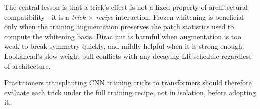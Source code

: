 \documentclass[10pt,twocolumn]{article}
\begin{document}
The central lesson is that a trick's effect is not a fixed property of architectural compatibility---it is a \emph{trick $\times$ recipe} interaction.
Frozen whitening is beneficial only when the training augmentation preserves the patch statistics used to compute the whitening basis.
Dirac init is harmful when augmentation is too weak to break symmetry quickly, and mildly helpful when it is strong enough.
Lookahead's slow-weight pull conflicts with any decaying LR schedule regardless of architecture.

Practitioners transplanting CNN training tricks to transformers should therefore evaluate each trick under the full training recipe, not in isolation, before adopting it.



\end{document}
